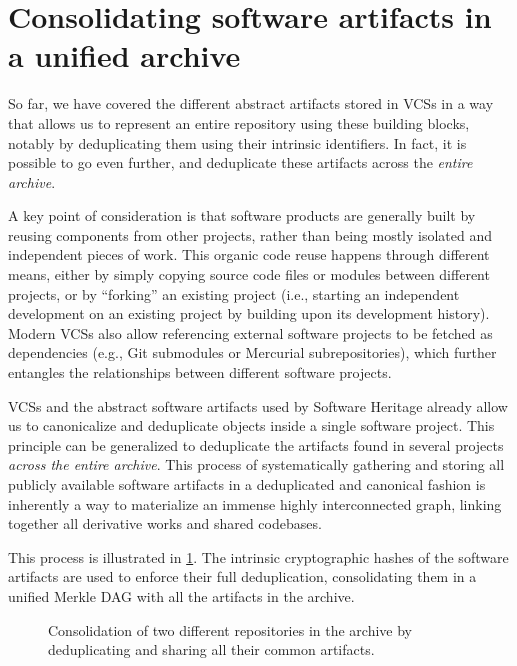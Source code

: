\section{Consolidating software artifacts in a unified archive}%
\label{sec:consolidation}

So far, we have covered the different abstract artifacts stored in \glspl{VCS}
in a way that allows us to represent an entire repository using these building
blocks, notably by deduplicating them using their intrinsic identifiers.
In fact, it is possible to go even further, and deduplicate these artifacts
across the \emph{entire archive}.

A key point of consideration is that software products are generally built by
reusing components from other projects, rather than being mostly isolated and
independent pieces of work. This organic code reuse happens through different
means, either by simply copying source code files or modules between different
projects, or by ``forking'' an existing project (i.e., starting an independent
development on an existing project by building upon its development history).
Modern \glspl{VCS} also allow referencing external software projects to be
fetched as dependencies (e.g., Git submodules or Mercurial subrepositories),
which further entangles the relationships between different software projects.

\glspl{VCS} and the abstract software artifacts used by Software Heritage
already allow us to canonicalize and deduplicate objects inside a single
software project. This principle can be generalized to deduplicate the
artifacts found in several projects \emph{across the entire archive}.
This process of systematically gathering and storing all publicly available
software artifacts in a deduplicated and canonical fashion is inherently a way
to materialize an immense highly interconnected graph, linking together all
derivative works and shared codebases.

This process is illustrated in \cref{fig:consolidating-archive}. The
intrinsic cryptographic hashes of the software artifacts are used to enforce
their full deduplication, consolidating them in a unified Merkle \gls{DAG} with
all the artifacts in the archive.

\begin{figure}
    \centering
    
    \caption{Consolidation of two different repositories in the archive by
    deduplicating and sharing all their common artifacts.}%
    \label{fig:consolidating-archive}
\end{figure}

